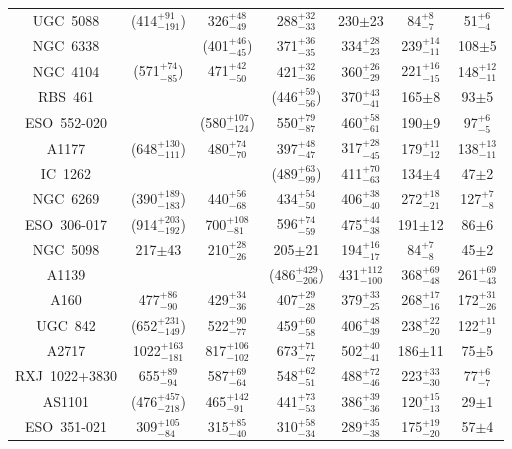\documentclass{aastex}
\begin{document}
\begin{table}
\begin{center}
{\begin{tabular}{ccccccc}
UGC~5088 & (414$^{+91}_{-191}$) & 326$^{+48}_{-49}$ & 288$^{+32}_{-33}$ & 230$\pm$23 & 84$^{+8}_{-7}$ & 51$^{+6}_{-4}$ \\
NGC~6338 & & (401$^{+46}_{-45}$) & 371$^{+36}_{-35}$ & 334$^{+28}_{-23}$ & 239$^{+14}_{-11}$ & 108$\pm$5 \\
NGC~4104 & (571$^{+74}_{-85}$) & 471$^{+42}_{-50}$ & 421$^{+32}_{-36}$ & 360$^{+26}_{-29}$ & 221$^{+16}_{-15}$ & 148$^{+12}_{-11}$ \\
RBS~461 & & & (446$^{+59}_{-56}$) & 370$^{+43}_{-41}$ & 165$\pm$8 & 93$\pm$5 \\
ESO~552-020 & & (580$^{+107}_{-124}$) & 550$^{+79}_{-87}$ & 460$^{+58}_{-61}$ & 190$\pm$9 & 97$^{+6}_{-5}$ \\
A1177 & (648$^{+130}_{-111}$) & 480$^{+74}_{-70}$ & 397$^{+48}_{-47}$ & 317$^{+28}_{-45}$ & 179$^{+11}_{-12}$ & 138$^{+13}_{-11}$ \\
IC~1262 & & & (489$^{+63}_{-99}$) & 411$^{+70}_{-63}$ & 134$\pm$4 & 47$\pm$2 \\
NGC~6269 & (390$^{+189}_{-183}$) & 440$^{+56}_{-68}$ & 434$^{+54}_{-50}$ & 406$^{+38}_{-40}$ & 272$^{+18}_{-21}$ & 127$^{+7}_{-8}$ \\
ESO~306-017 & (914$^{+203}_{-192}$) & 700$^{+108}_{-81}$ & 596$^{+74}_{-59}$ & 475$^{+44}_{-38}$ & 191$\pm$12 & 86$\pm$6 \\
NGC~5098 & 217$\pm$43 & 210$^{+28}_{-26}$ & 205$\pm$21 & 194$^{+16}_{-17}$ & 84$^{+7}_{-8}$ & 45$\pm$2 \\
A1139 & & & (486$^{+429}_{-206}$) & 431$^{+112}_{-100}$ & 368$^{+69}_{-48}$ & 261$^{+69}_{-43}$ \\
A160 & 477$^{+86}_{-90}$ & 429$^{+34}_{-36}$ & 407$^{+29}_{-28}$ & 379$^{+33}_{-25}$ & 268$^{+17}_{-16}$ & 172$^{+31}_{-26}$ \\
UGC~842 & (652$^{+231}_{-149}$) & 522$^{+90}_{-77}$ & 459$^{+60}_{-58}$ & 406$^{+48}_{-39}$ & 238$^{+22}_{-20}$ & 122$^{+11}_{-9}$ \\
A2717 & 1022$^{+163}_{-181}$ & 817$^{+106}_{-102}$ & 673$^{+71}_{-77}$ & 502$^{+40}_{-41}$ & 186$\pm$11 & 75$\pm$5 \\
RXJ~1022+3830 & 655$^{+89}_{-94}$ & 587$^{+69}_{-64}$ & 548$^{+62}_{-51}$ & 488$^{+72}_{-46}$ & 223$^{+33}_{-30}$ & 77$^{+6}_{-7}$ \\
AS1101 & (476$^{+457}_{-218}$) & 465$^{+142}_{-91}$ & 441$^{+73}_{-53}$ & 386$^{+39}_{-36}$ & 120$^{+15}_{-13}$ & 29$\pm$1 \\
ESO~351-021 & 309$^{+105}_{-84}$ & 315$^{+85}_{-40}$ & 310$^{+58}_{-34}$ & 289$^{+35}_{-38}$ & 175$^{+19}_{-20}$ & 57$\pm$4 \\

\end{tabular}}
\end{center}
\end{table}
\end{document}
